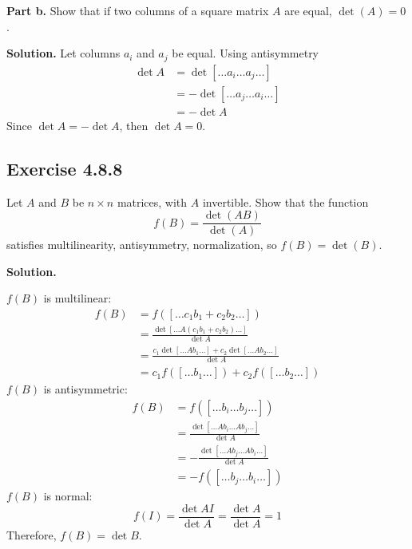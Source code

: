 \documentclass[12pt]{article}
\begin{document}
\noindent \textbf{Part b.}
Show that if two columns of a square matrix $A$ are equal, $\det(A) = 0$.
\medskip

\textbf{Solution.}
Let columns $a_i$ and $a_j$ be equal.
Using antisymmetry 
\begin{align}
    \det A 
    &= \det [\hdots a_i \hdots a_j \hdots] \\
    &= -\det [\hdots a_j \hdots a_i \hdots] \\
    &= -\det A
\end{align}
Since $\det A  = -\det A$, then $\det A = 0$.
\newpage












\subsection*{Exercise 4.8.8}
Let $A$ and $B$ be $n\times n$ matrices, with $A$ invertible. Show that the function
$$
f(B) = \frac{\det(AB)}{\det(A)}
$$
satisfies multilinearity, antisymmetry, normalization, so $f(B) = \det(B)$.

\medskip

\textbf{Solution.}

$f(B)$ is multilinear:
\begin{align*}
    f(B)
    &= f([\hdots c_1b_1+c_2b_2 \hdots]) \\
    &= \frac{\det[\hdots A(c_1b_1+c_2b_2) \hdots]}{\det{A}} \\
    &= \frac{c_1\det[\hdots Ab_1\hdots] + c_2\det[\hdots Ab_2\hdots]}{\det{A}} \\
    &= c_1f([\hdots b_1 \hdots]) + c_2f([\hdots b_2 \hdots])
\end{align*}
$f(B)$ is antisymmetric:
\begin{align*}
    f(B)
    &= f([\hdots b_i \hdots b_j \hdots]) \\
    &= \frac{\det [\hdots Ab_i \hdots Ab_j \hdots]}{\det{A}} \\
    &= -\frac{\det [\hdots Ab_j \hdots Ab_i \hdots]}{\det{A}} \\
    &= - f([\hdots b_j \hdots b_i \hdots])
\end{align*}
$f(B)$ is normal:
\[
    f(I)
    = \frac{\det AI}{\det{A}}
    = \frac{\det A}{\det{A}}
    = 1
\]
Therefore, $f(B) = \det B$.
\newpage
\end{document}
